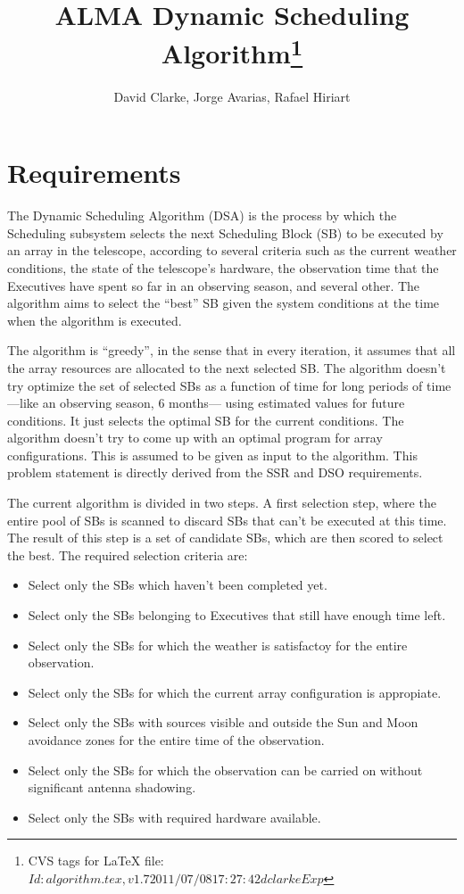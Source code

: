 \documentclass{article}
\title{ALMA Dynamic Scheduling Algorithm\footnote{CVS tags for LaTeX file: $Id: algorithm.tex,v 1.7 2011/07/08 17:27:42 dclarke Exp $}}
\author{David Clarke, Jorge Avarias, Rafael Hiriart}
\begin{document}
\maketitle

\section{Requirements}

The Dynamic Scheduling Algorithm (DSA) is the process by which the Scheduling
subsystem selects the next Scheduling Block (SB) to be executed by an array in the
telescope, according to several criteria such as the current weather conditions,
the state of the telescope's hardware, the observation time that the Executives 
have spent so far in an observing season, and several other. The algorithm aims to
select the ``best'' SB given the system conditions at the time when the algorithm is
executed.

The algorithm is ``greedy'', in the sense that in every iteration, it assumes
that all the array resources are allocated to the next selected SB. The algorithm doesn't
try optimize the set of selected SBs as a function of time for long periods of time
---like an observing season, 6 months--- using estimated values for future conditions.
It just selects the optimal SB for the current conditions. The algorithm doesn't try to
come up with an optimal program for array configurations. This is assumed to be given as
input to the algorithm. This problem statement is directly derived from the SSR and
DSO requirements.

The current algorithm is divided in two steps. A first selection step, where the entire
pool of SBs is scanned to discard SBs that can't be executed
at this time. The result of this step is a set of candidate SBs, which are then scored
to select the best. The required selection criteria are:
\begin{itemize}
\item Select only the SBs which haven't been completed yet.
\item Select only the SBs belonging to Executives that still have enough time left.
\item Select only the SBs for which the weather is satisfactoy for the entire observation.
\item Select only the SBs for which the current array configuration is appropiate.
\item Select only the SBs with sources visible and outside the Sun and Moon avoidance zones
for the entire time of the observation.
\item Select only the SBs for which the observation can be carried on without significant
antenna shadowing.
\item Select only the SBs with required hardware available.
\end{itemize} 
\end{document}
